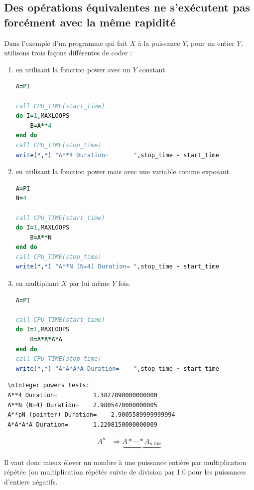 \documentclass[a4paper,twoside]{article}
\begin{document}
\subsection{Des opérations équivalentes ne s'exécutent pas forcément avec la même rapidité}
Dans l'exemple d'un programme qui fait $X$ à la puissance $Y$, pour un entier $Y$, utilisons trois façons différentes de coder :
\begin{enumerate}
\item en utilisant la fonction power avec un $Y$ constant
\begin{lstlisting}[language=Fortran]
A=PI

call CPU_TIME(start_time)
do I=1,MAXLOOPS
    B=A**4
end do
call CPU_TIME(stop_time)
write(*,*) "A**4 Duration=       ",stop_time - start_time
\end{lstlisting}

\item en utilisant la fonction power mais avec une variable comme exposant.
\begin{lstlisting}[language=Fortran]
A=PI
N=4

call CPU_TIME(start_time)
do I=1,MAXLOOPS
    B=A**N
end do
call CPU_TIME(stop_time)
write(*,*) "A**N (N=4) Duration= ",stop_time - start_time
\end{lstlisting}

\item en multipliant $X$ par lui même $Y$ fois.
\begin{lstlisting}[language=Fortran]
A=PI

call CPU_TIME(start_time)
do I=1,MAXLOOPS
    B=A*A*A*A
end do
call CPU_TIME(stop_time)
write(*,*) "A*A*A*A Duration=    ",stop_time - start_time
\end{lstlisting}

\end{enumerate}

\begin{verbatim}
 \nInteger powers tests:
 A**4 Duration=          1.3827890000000000     
 A**N (N=4) Duration=    2.9805470000000005     
 A**pN (pointer) Duration=    2.9005589999999994     
 A*A*A*A Duration=       1.2208150000000009     
\end{verbatim}

\begin{important}
\begin{align}
A^n & \Rightarrow \underbrace{A * \cdots * A_{\text{$n$ fois}}}
\end{align}

Il vaut donc mieux élever un nombre à une puissance entière par multiplication répétée (ou multiplication répétée suivie de division par 1.0 pour les puissances d'entiers négatifs.
\end{important}
\end{document}
